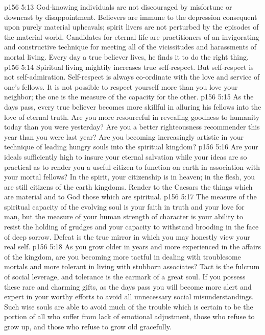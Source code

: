 \vs p156 5:13 God\hyp{}knowing individuals are not discouraged by misfortune or downcast by disappointment. Believers are immune to the depression consequent upon purely material upheavals; spirit livers are not perturbed by the episodes of the material world. Candidates for eternal life are practitioners of an invigorating and constructive technique for meeting all of the vicissitudes and harassments of mortal living. Every day a true believer lives, he finds it  to do the right thing.
\vs p156 5:14 Spiritual living mightily increases true self\hyp{}respect. But self\hyp{}respect is not self\hyp{}admiration. Self\hyp{}respect is always co\hyp{}ordinate with the love and service of one’s fellows. It is not possible to respect yourself more than you love your neighbor; the one is the measure of the capacity for the other.
\vs p156 5:15 As the days pass, every true believer becomes more skillful in alluring his fellows into the love of eternal truth. Are you more resourceful in revealing goodness to humanity today than you were yesterday? Are you a better righteousness recommender this year than you were last year? Are you becoming increasingly artistic in your technique of leading hungry souls into the spiritual kingdom?
\vs p156 5:16 Are your ideals sufficiently high to insure your eternal salvation while your ideas are so practical as to render you a useful citizen to function on earth in association with your mortal fellows? In the spirit, your citizenship is in heaven; in the flesh, you are still citizens of the earth kingdoms. Render to the Caesars the things which are material and to God those which are spiritual.
\vs p156 5:17 The measure of the spiritual capacity of the evolving soul is your faith in truth and your love for man, but the measure of your human strength of character is your ability to resist the holding of grudges and your capacity to withstand brooding in the face of deep sorrow. Defeat is the true mirror in which you may honestly view your real self.\plusone
\vs p156 5:18 As you grow older in years and more experienced in the affairs of the kingdom, are you becoming more tactful in dealing with troublesome mortals and more tolerant in living with stubborn associates? Tact is the fulcrum of social leverage, and tolerance is the earmark of a great soul. If you possess these rare and charming gifts, as the days pass you will become more alert and expert in your worthy efforts to avoid all unnecessary social misunderstandings. Such wise souls are able to avoid much of the trouble which is certain to be the portion of all who suffer from lack of emotional adjustment, those who refuse to grow up, and those who refuse to grow old gracefully.\plusone
